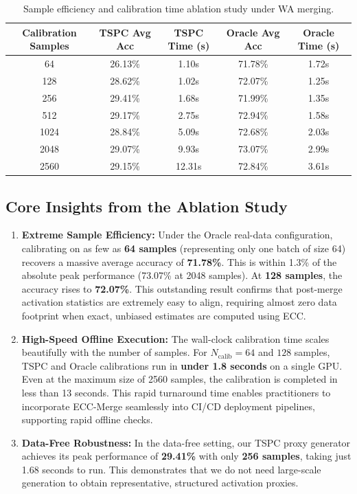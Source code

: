 \documentclass{article}
\theoremstyle{plain}
\theoremstyle{definition}
\theoremstyle{remark}
\begin{document}
\begin{table}[h]
\caption{Sample efficiency and calibration time ablation study under WA merging.}
\label{tab:ablation}
\vskip 0.15in
\begin{center}
\begin{small}
\begin{sc}
\begin{tabular}{ccccc}
\toprule
Calibration Samples & TSPC Avg Acc & TSPC Time (s) & Oracle Avg Acc & Oracle Time (s) \\
\midrule
64 & 26.13\% & 1.10s & 71.78\% & 1.72s \\
128 & 28.62\% & 1.02s & 72.07\% & 1.25s \\
256 & 29.41\% & 1.68s & 71.99\% & 1.35s \\
512 & 29.17\% & 2.75s & 72.94\% & 1.58s \\
1024 & 28.84\% & 5.09s & 72.68\% & 2.03s \\
2048 & 29.07\% & 9.93s & 73.07\% & 2.99s \\
2560 & 29.15\% & 12.31s & 72.84\% & 3.61s \\
\bottomrule
\end{tabular}
\end{sc}
\end{small}
\end{center}
\vskip -0.1in
\end{table}

\subsection{Core Insights from the Ablation Study}
\begin{enumerate}
    \item \textbf{Extreme Sample Efficiency:} Under the Oracle real-data configuration, calibrating on as few as \textbf{64 samples} (representing only one batch of size 64) recovers a massive average accuracy of \textbf{71.78\%}. This is within 1.3\% of the absolute peak performance (73.07\% at 2048 samples). At \textbf{128 samples}, the accuracy rises to \textbf{72.07\%}. This outstanding result confirms that post-merge activation statistics are extremely easy to align, requiring almost zero data footprint when exact, unbiased estimates are computed using ECC.
    \item \textbf{High-Speed Offline Execution:} The wall-clock calibration time scales beautifully with the number of samples. For $N_{\text{calib}} = 64$ and $128$ samples, TSPC and Oracle calibrations run in \textbf{under 1.8 seconds} on a single GPU. Even at the maximum size of 2560 samples, the calibration is completed in less than 13 seconds. This rapid turnaround time enables practitioners to incorporate ECC-Merge seamlessly into CI/CD deployment pipelines, supporting rapid offline checks.
    \item \textbf{Data-Free Robustness:} In the data-free setting, our TSPC proxy generator achieves its peak performance of \textbf{29.41\%} with only \textbf{256 samples}, taking just 1.68 seconds to run. This demonstrates that we do not need large-scale generation to obtain representative, structured activation proxies.
\end{enumerate}
\end{document}

